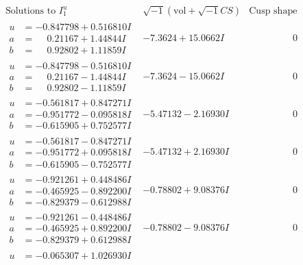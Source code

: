 \documentclass[1p]{elsarticle_modified}
\theoremstyle{definition}
\newcommand{\I}{\sqrt{-1}}
\begin{document}
$$\begin{array}{c|c|c}  
\text{Solutions to }I^u_{1}& \I (\text{vol} + \sqrt{-1}CS) & \text{Cusp shape}\\
 \hline 
\begin{aligned}
u &= -0.847798 + 0.516810 I \\
a &= \phantom{-}0.21167 + 1.44844 I \\
b &= \phantom{-}0.92802 + 1.11859 I\end{aligned}
 & -7.3624 + 15.0662 I & \phantom{-0.000000 } 0 \\ \hline\begin{aligned}
u &= -0.847798 - 0.516810 I \\
a &= \phantom{-}0.21167 - 1.44844 I \\
b &= \phantom{-}0.92802 - 1.11859 I\end{aligned}
 & -7.3624 - 15.0662 I & \phantom{-0.000000 } 0 \\ \hline\begin{aligned}
u &= -0.561817 + 0.847271 I \\
a &= -0.951772 - 0.095818 I \\
b &= -0.615905 + 0.752577 I\end{aligned}
 & -5.47132 - 2.16930 I & \phantom{-0.000000 } 0 \\ \hline\begin{aligned}
u &= -0.561817 - 0.847271 I \\
a &= -0.951772 + 0.095818 I \\
b &= -0.615905 - 0.752577 I\end{aligned}
 & -5.47132 + 2.16930 I & \phantom{-0.000000 } 0 \\ \hline\begin{aligned}
u &= -0.921261 + 0.448486 I \\
a &= -0.465925 - 0.892200 I \\
b &= -0.829379 - 0.612988 I\end{aligned}
 & -0.78802 + 9.08376 I & \phantom{-0.000000 } 0 \\ \hline\begin{aligned}
u &= -0.921261 - 0.448486 I \\
a &= -0.465925 + 0.892200 I \\
b &= -0.829379 + 0.612988 I\end{aligned}
 & -0.78802 - 9.08376 I & \phantom{-0.000000 } 0 \\ \hline\begin{aligned}
u &= -0.065307 + 1.026930 I \\

\end{aligned}
\end{array}$$
\end{document}
